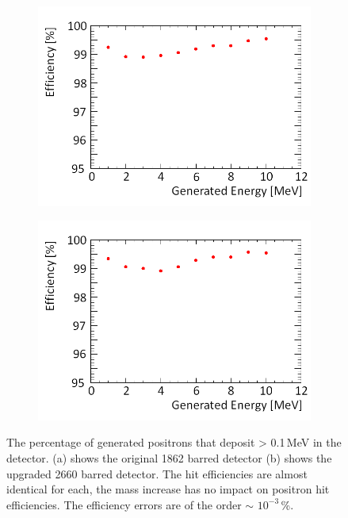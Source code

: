 \begin{figure}[!h]
\centering
\begin{subfigure}{.5\textwidth}
  \centering
  \includegraphics[width=\linewidth]{Chapter4/Figs/Raster/year1Plots/2000_1-10MeV_sec_p_spread_run_medText.png}
  \captionsetup{width=.9\linewidth}
  \caption{}
  \label{subFig:2000_p_sec}
\end{subfigure}%
\begin{subfigure}{.5\textwidth}
  \centering
  \includegraphics[width=\linewidth]{Chapter4/Figs/Raster/year1Plots/3000_1-10MeV_sec_p_spread_run_medText.png}
  \captionsetup{width=.9\linewidth}
  \caption{}
  \label{subFig:3000_p_sec}
\end{subfigure}
\caption[Positron hit efficiencies for the original and upgraded detector.]{The percentage of generated positrons that deposit > 0.1\,MeV in the detector. (a) shows the original 1862 barred detector (b) shows the upgraded 2660 barred detector. The hit efficiencies are almost identical for each, the mass increase has no impact on positron hit efficiencies. The efficiency errors are of the order $\sim$ $10^{-3}$\,\%.}%

\end{figure}
